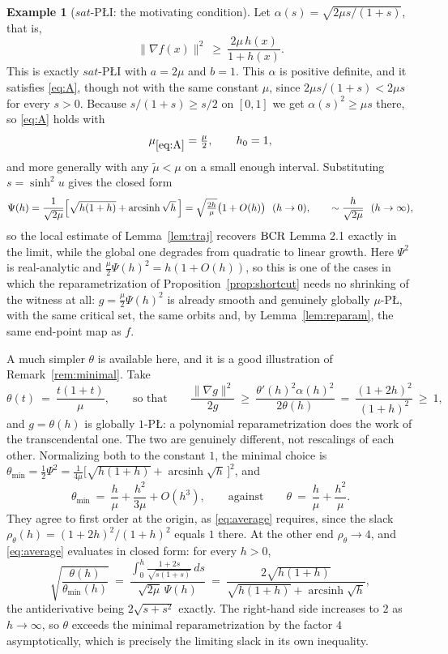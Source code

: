 \documentclass[11pt]{article}
\theoremstyle{plain}
\theoremstyle{definition}
\newtheorem{ex}[thm]{Example}
\theoremstyle{remark}
\newcommand{\bcr}{\textup{BCR}}
\begin{document}
\begin{ex}[$sat$-P\L{}I: the motivating condition]\label{ex:bounded}
Let $\alpha(s) = \sqrt{2\mu s/(1+s)}$, that is,
\[
  \|\nabla f(x)\|^2 \ \ge\ \frac{2\mu\,h(x)}{1+h(x)} .
\]
This is exactly $sat$-P\L{}I with $a = 2\mu$ and $b=1$. This $\alpha$ is positive
definite, and it satisfies \eqref{eq:A}, though not with the same constant
$\mu$, since $2\mu s/(1+s)<2\mu s$ for every $s>0$. Because $s/(1+s)\ge s/2$ on
$[0,1]$ we get $\alpha(s)^2 \ge \mu s$ there, so \eqref{eq:A} holds with
\[
  \mu_{\eqref{eq:A}} = \tfrac{\mu}{2} , \qquad h_0 = 1 ,
\]
and more generally with any $\tilde\mu<\mu$ on a small enough interval.
Substituting
$s=\sinh^2 u$ gives the closed form
\[
  \Psi(h) = \frac{1}{\sqrt{2\mu}}\Bigl[\sqrt{h(1+h)} + \operatorname{arcsinh}\sqrt h\,\Bigr]
  = \sqrt{\tfrac{2h}{\mu}}\bigl(1+O(h)\bigr) \ \ (h\to0),
  \qquad \sim \frac{h}{\sqrt{2\mu}} \ \ (h\to\infty) ,
\]
so the local estimate of Lemma~\ref{lem:traj} recovers $\bcr$ Lemma 2.1 exactly
in the limit, while the global one degrades from quadratic to linear growth.
Here $\Psi^2$ is real-analytic and $\tfrac\mu2\Psi(h)^2 = h(1+O(h))$, so this is
one of the cases in which the reparametrization of
Proposition~\ref{prop:shortcut} needs no shrinking of the witness at all:
$g=\tfrac\mu2\Psi(h)^2$ is already smooth and genuinely globally $\mu$-P\L{}, with
the same critical set, the same orbits and, by Lemma~\ref{lem:reparam}, the same
end-point map as $f$.

A much simpler $\theta$ is available here, and it is a good illustration of
Remark~\ref{rem:minimal}. Take
\[
  \theta(t) \ =\ \frac{t(1+t)}{\mu} ,
  \qquad\text{so that}\qquad
  \frac{\|\nabla g\|^2}{2g} \ \ge\ \frac{\theta'(h)^2\alpha(h)^2}{2\theta(h)}
  \ =\ \frac{(1+2h)^2}{(1+h)^2} \ \ge\ 1 ,
\]
and $g=\theta(h)$ is globally $1$-P\L{}: a polynomial reparametrization does the work
of the transcendental one. The two are genuinely different, not rescalings of each
other. Normalizing both to the constant $1$, the minimal choice is
$\theta_{\min}=\tfrac12\Psi^2 = \tfrac{1}{4\mu}\bigl[\sqrt{h(1+h)}+\operatorname{arcsinh}\sqrt h\,\bigr]^2$, and
\[
  \theta_{\min} \ =\ \frac{h}{\mu} + \frac{h^2}{3\mu} + O(h^3) ,
  \qquad\text{against}\qquad
  \theta \ =\ \frac{h}{\mu} + \frac{h^2}{\mu} .
\]
They agree to first order at the origin, as \eqref{eq:average} requires, since the
slack $\rho_\theta(h)=(1+2h)^2/(1+h)^2$ equals $1$ there. At the other end
$\rho_\theta\to4$, and \eqref{eq:average} evaluates in closed form: for every $h>0$,
\[
  \sqrt{\frac{\theta(h)}{\theta_{\min}(h)}}
  \ =\ \frac{\int_0^h\frac{1+2s}{\sqrt{s(1+s)}}\,ds}{\sqrt{2\mu}\,\Psi(h)}
  \ =\ \frac{2\sqrt{h(1+h)}}{\sqrt{h(1+h)}+\operatorname{arcsinh}\sqrt h} ,
\]
the antiderivative being $2\sqrt{s+s^2}$ exactly. The right-hand side increases to
$2$ as $h\to\infty$, so $\theta$ exceeds the minimal reparametrization by the factor
$4$ asymptotically, which is precisely the limiting slack in its own inequality.


\end{ex}
\end{document}
